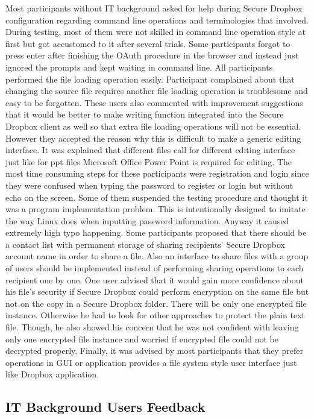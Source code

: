 Most participants without IT background asked for help during Secure Dropbox configuration regarding command line operations and terminologies that involved. During testing, most of them were not skilled in command line operation style at first but got accustomed to it after several trials. Some participants forgot to press enter after finishing the OAuth procedure in the browser and instead just ignored the prompts and kept waiting in command line. All participants performed the file loading operation easily. Participant complained about that changing the source file requires another file loading operation is troublesome and easy to be forgotten. These users also commented with improvement suggestions that it would be better to make writing function integrated into the Secure Dropbox client as well so that extra file loading operations will not be essential. However they accepted the reason why this is difficult to make a generic editing interface. It was explained that different files call for different editing interface just like for ppt files Microsoft Office Power Point is required for editing. The most time consuming steps for these participants were registration and login since they were confused when typing the password to register or login but without echo on the screen. Some of them suspended the testing procedure and thought it was a program implementation problem. This is intentionally designed to imitate the way Linux does when inputting password information. Anyway it caused extremely high typo happening. Some participants proposed that there should be a contact list with permanent storage of sharing recipients’ Secure Dropbox account name in order to share a file. Also an interface to share files with a group of users should be implemented instead of performing sharing operations to each recipient one by one. One user advised that it would gain more confidence about his file’s security if Secure Dropbox could perform encryption on the same file but not on the copy in a Secure Dropbox folder. There will be only one encrypted file instance. Otherwise he had to look for other approaches to protect the plain text file. Though, he also showed his concern that he was not confident with leaving only one encrypted file instance and worried if encrypted file could not be decrypted properly. Finally, it was advised by most participants that they prefer operations in GUI or application provides a file system style user interface just like Dropbox application.

\subsection{IT Background Users Feedback}

